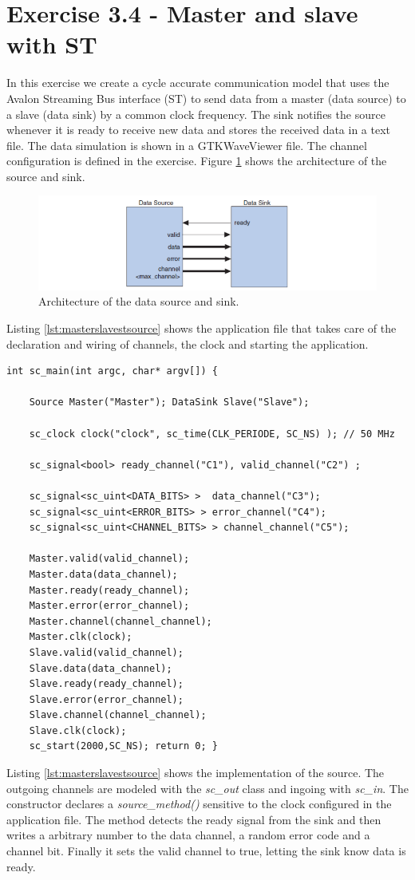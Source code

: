 \section{Exercise 3.4 - Master and slave with ST}

In this exercise we create a cycle accurate communication model that uses the Avalon Streaming Bus interface (ST) to send data from a master (data source) to a slave (data sink) by a common clock frequency. The sink notifies the source whenever it is ready to receive new data and stores the received data in a text file. The data simulation is shown in a GTKWaveViewer file. The channel configuration is defined in the exercise. Figure \ref{fig:masterslave} shows the architecture of the source and sink.

\begin{figure}[h]
	\centering
	\includegraphics[width=0.8\linewidth]{MasterSlaveST.png}
	\caption{Architecture of the data source and sink.}
	\label{fig:masterslave}
\end{figure}

\noindent Listing \ref{lst:masterslavestsource} shows the application file that takes care of the declaration and wiring of channels, the clock and starting the application.

\begin{lstlisting}[style=customc++, caption=Application file for mater/slave.,
label={lst:masterslavestmain}]
int sc_main(int argc, char* argv[]) {
	
	Source Master("Master"); DataSink Slave("Slave");
	
	sc_clock clock("clock", sc_time(CLK_PERIODE, SC_NS) ); // 50 MHz
	
	sc_signal<bool> ready_channel("C1"), valid_channel("C2") ;
	
	sc_signal<sc_uint<DATA_BITS> >  data_channel("C3");
	sc_signal<sc_uint<ERROR_BITS> > error_channel("C4");
	sc_signal<sc_uint<CHANNEL_BITS> > channel_channel("C5");
	
	Master.valid(valid_channel);
	Master.data(data_channel);
	Master.ready(ready_channel);
	Master.error(error_channel);
	Master.channel(channel_channel);
	Master.clk(clock);
	Slave.valid(valid_channel);
	Slave.data(data_channel);
	Slave.ready(ready_channel);
	Slave.error(error_channel);
	Slave.channel(channel_channel);
	Slave.clk(clock);
	sc_start(2000,SC_NS); return 0; }
\end{lstlisting}
\newpage
\noindent Listing \ref{lst:masterslavestsource} shows the implementation of the source. The outgoing channels are modeled with the \textit{sc\_out} class and ingoing with \textit{sc\_in}. The constructor declares a \textit{source\_method()} sensitive to the  clock configured in the application file. The method detects the ready signal from the sink and then writes a arbitrary number to the data channel, a random error code and a channel bit. Finally it sets the valid channel to true, letting the sink know data is ready.

